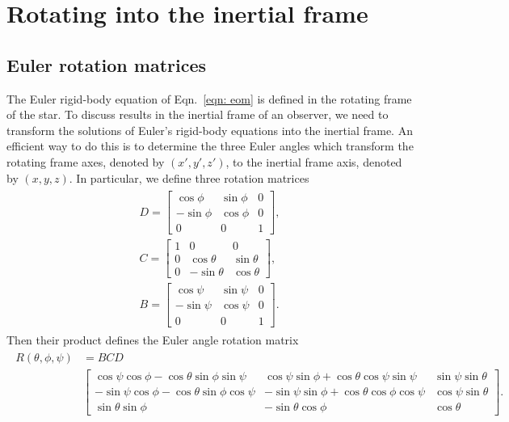 \documentclass[../full_thesis/full_thesis.tex]{subfiles}
\begin{document}
\section{Rotating into the inertial frame}
\label{sec: rotating}

\subsection{Euler rotation matrices}
\label{sec: euler rotation matrices}
The Euler rigid-body equation of Eqn.~\eqref{eqn: eom} is defined in the
rotating frame of the star. To discuss results in the inertial frame of an
observer, we need to transform the solutions of Euler's rigid-body equations
into the inertial frame.  An efficient way to do this is to determine the three
Euler angles which transform the rotating frame axes, denoted by $(x',y',
z')$, to the inertial frame axis, denoted by $(x, y, z)$. In particular, we
define three rotation matrices
\begin{align}
\begin{split}
D = \left[\begin{array}{ccc}
\cos\phi & \sin\phi & 0 \\
-\sin\phi & \cos\phi & 0 \\
0 & 0 & 1
\end{array}
\right],
\\
C =
\left[\begin{array}{ccc}
1 & 0 & 0 \\
0 & \cos\theta & \sin\theta \\
0 & -\sin\theta & \cos\theta
\end{array}
\right], \\
B = \left[\begin{array}{ccc}
\cos\psi & \sin\psi & 0 \\
-\sin\psi & \cos\psi & 0 \\
0 & 0 & 1
\end{array}
\right].
\end{split}
\end{align}
Then their product defines the Euler angle rotation matrix
\begin{align}
\begin{split}
R(\theta, \phi, \psi) & = BCD \\
& \left[
\begin{array}{ccc}
\cos\psi \cos\phi - \cos\theta \sin\phi \sin \psi &
\cos\psi \sin \phi + \cos\theta \cos \psi \sin \psi &
\sin \psi \sin\theta \\
-\sin\psi \cos\phi - \cos\theta\sin\phi\cos\psi &
-\sin\psi\sin\phi + \cos\theta\cos\phi\cos\psi &
\cos\psi \sin\theta \\
\sin\theta\sin\phi &
-\sin\theta \cos\phi &
\cos\theta
\end{array}
\right].
\end{split}
\label{eqn: rotation matrix}
\end{align}
\end{document}
